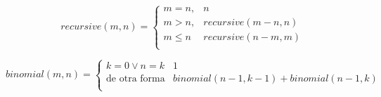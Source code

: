 \documentclass[12pt,letterpaper]{article}
\begin{document}
\[
  recursive(m,n) =
  \begin{cases}
    m = n, & n \\
    m > n, & recursive(m-n,n) \\
    m \leq n & recursive(n-m,m) \\
  \end{cases}
\]


\[
  binomial(m,n) =
  \begin{cases}
    k = 0 \vee n = k & 1 \\
    \text{de otra forma} & binomial(n - 1,k - 1) + binomial(n - 1, k) \\
  \end{cases}
\]
\end{document}

